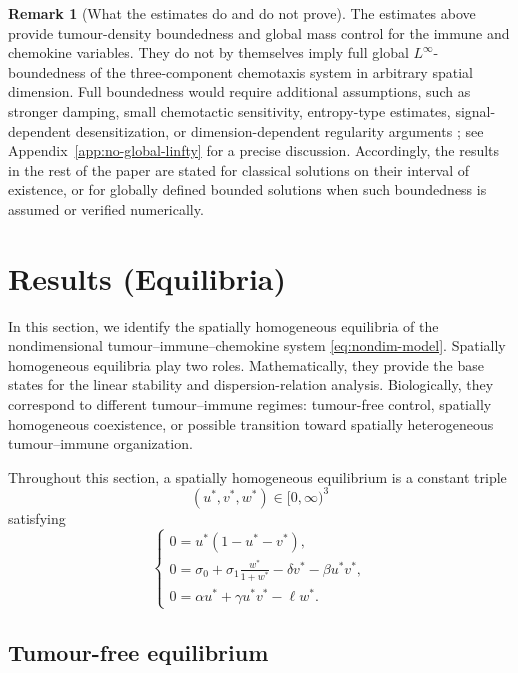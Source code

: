 \documentclass[a4paper,fleqn,longmktitle]{cas-sc}
\theoremstyle{plain}
\theoremstyle{definition}
\newtheorem{remark}[theorem]{Remark}
\numberwithin{equation}{section}
\begin{document}
\begin{remark}[What the estimates do and do not prove]
\label{rem:no-global-linfty-overclaim}
The estimates above provide tumour-density boundedness and global mass control
for the immune and chemokine variables. They do not by themselves imply full
global $L^\infty$-boundedness of the three-component chemotaxis system in
arbitrary spatial dimension. Full boundedness would require additional
assumptions, such as stronger damping, small chemotactic sensitivity,
entropy-type estimates, signal-dependent desensitization, or
dimension-dependent regularity arguments \cite{winkler2010aggregation,liu2026computational,tao2012boundedness}; see
Appendix~\ref{app:no-global-linfty} for a precise discussion. Accordingly, the
results in the rest of the paper are stated for classical solutions on their
interval of existence, or for globally defined bounded solutions when such
boundedness is assumed or verified numerically.
\end{remark}

\section{Results (Equilibria)}
\label{sec:equilibria-biological-regimes}

In this section, we identify the spatially homogeneous equilibria of the
nondimensional tumour--immune--chemokine system \eqref{eq:nondim-model}.
Spatially homogeneous equilibria play two roles. Mathematically, they provide
the base states for the linear stability and dispersion-relation analysis.
Biologically, they correspond to different tumour--immune regimes: tumour-free
control, spatially homogeneous coexistence, or possible transition toward
spatially heterogeneous tumour--immune organization.

Throughout this section, a spatially homogeneous equilibrium is a constant
triple
\[
(u^*,v^*,w^*)\in[0,\infty)^3
\]
satisfying
\begin{equation}\label{eq:homogeneous-equilibrium-system}
\begin{cases}
0=u^*(1-u^*-v^*),\\[2pt]
0=\sigma_0+\sigma_1\frac{w^*}{1+w^*}-\delta v^*-\beta u^*v^*,\\[2pt]
0=\alpha u^*+\gamma u^*v^*-\ell w^*.
\end{cases}
\end{equation}

\subsection{Tumour-free equilibrium}
\label{subsec:tumour-free-equilibrium}
\end{document}
